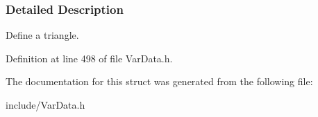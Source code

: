 \subsubsection{\-Detailed \-Description}
\-Define a triangle. 

\-Definition at line 498 of file \-Var\-Data.\-h.



\-The documentation for this struct was generated from the following file\-:\begin{DoxyCompactItemize}
\item 
include/\-Var\-Data.\-h\end{DoxyCompactItemize}
